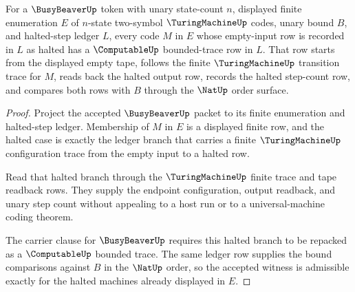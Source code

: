 \begin{theorem}
\label{thm:busybeaver-halted-bound-admissibility}
For a $\BusyBeaverUp$ token with unary state-count $n$, displayed finite
enumeration $E$ of $n$-state two-symbol $\TuringMachineUp$ codes, unary bound
$B$, and halted-step ledger $L$, every code $M$ in $E$ whose empty-input row is
recorded in $L$ as halted has a $\ComputableUp$ bounded-trace row in $L$. That
row starts from the displayed empty tape, follows the finite
$\TuringMachineUp$ transition trace for $M$, reads back the halted output row,
records the halted step-count row, and compares both rows with $B$ through the
$\NatUp$ order surface.
\end{theorem}
\begin{proof}
Project the accepted $\BusyBeaverUp$ packet to its finite enumeration and
halted-step ledger. Membership of $M$ in $E$ is a displayed finite row, and the
halted case is exactly the ledger branch that carries a finite
$\TuringMachineUp$ configuration trace from the empty input to a halted row.

Read that halted branch through the $\TuringMachineUp$ finite trace and tape
readback rows. They supply the endpoint configuration, output readback, and
unary step count without appealing to a host run or to a universal-machine
coding theorem.

The carrier clause for $\BusyBeaverUp$ requires this halted branch to be
repacked as a $\ComputableUp$ bounded trace. The same ledger row supplies the
bound comparisons against $B$ in the $\NatUp$ order, so the accepted witness is
admissible exactly for the halted machines already displayed in $E$.
\end{proof}


